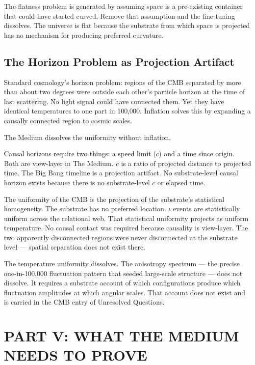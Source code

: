 \documentclass[11pt,letterpaper]{article}
\begin{document}
The flatness problem is generated by assuming space is a pre-existing container that could have started curved. Remove that assumption and the fine-tuning dissolves. The universe is flat because the substrate from which space is projected has no mechanism for producing preferred curvature.


\subsection{The Horizon Problem as Projection Artifact}
\label{sec:orgda21f21}

Standard cosmology's horizon problem: regions of the CMB separated by more than about two degrees were outside each other's particle horizon at the time of last scattering. No light signal could have connected them. Yet they have identical temperatures to one part in 100,000. Inflation solves this by expanding a causally connected region to cosmic scales.

The Medium dissolves the uniformity without inflation.

Causal horizons require two things: a speed limit (\(c\)) and a time since origin. Both are view-layer in The Medium. \(c\) is a ratio of projected distance to projected time. The Big Bang timeline is a projection artifact. No substrate-level causal horizon exists because there is no substrate-level \(c\) or elapsed time.

The uniformity of the CMB is the projection of the substrate's statistical homogeneity. The substrate has no preferred location. \(\iota\) events are statistically uniform across the relational web. That statistical uniformity projects as uniform temperature. No causal contact was required because causality is view-layer. The two apparently disconnected regions were never disconnected at the substrate level --- spatial separation does not exist there.

The temperature uniformity dissolves. The anisotropy spectrum --- the precise one-in-100,000 fluctuation pattern that seeded large-scale structure --- does not dissolve. It requires a substrate account of which configurations produce which fluctuation amplitudes at which angular scales. That account does not exist and is carried in the CMB entry of Unresolved Questions.

\section{PART V: WHAT THE MEDIUM NEEDS TO PROVE}
\label{sec:org614a637}
\end{document}
